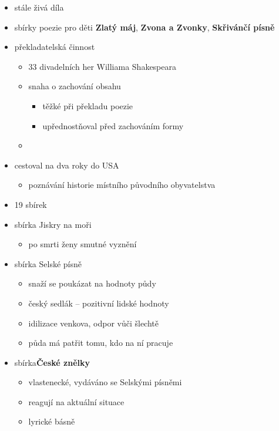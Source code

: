 \begin{itemize}
\item stále živá díla
\item sbírky poezie pro děti \textbf{Zlatý máj}, \textbf{Zvona a Zvonky}, \textbf{Skřivánčí písně}
\item překladatelská činnost
	\begin{itemize}
	\item 33 divadelních her Williama Shakespeara
	\item snaha o zachování obsahu
		\begin{itemize}
		\item těžké při překladu poezie
		\item upřednostňoval před zachováním formy
		\end{itemize}
	\item 
	\end{itemize}
\item cestoval na dva roky do USA
	\begin{itemize}
	\item poznávání historie místního původního obyvatelstva
	\end{itemize}
\item 19 sbírek
\item sbírka Jiskry na moři
	\begin{itemize}
	\item po smrti ženy \ra smutné vyznění
	\end{itemize}
\item sbírka Selské písně
	\begin{itemize}
	\item snaží se poukázat na hodnoty půdy
	\item český sedlák -- pozitivní lidské hodnoty
	\item idilizace venkova, odpor vůči šlechtě
	\item půda má patřit tomu, kdo na ní pracuje 
	\end{itemize}
\item sbírka\textbf{České znělky}
	\begin{itemize}
	\item vlastenecké, vydáváno se Selskými písněmi
	\item reagují na aktuální situace
	\item lyrické básně
	\end{itemize}
\end{itemize}

